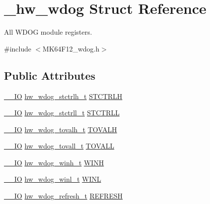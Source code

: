 \hypertarget{struct__hw__wdog}{}\section{\+\_\+hw\+\_\+wdog Struct Reference}
\label{struct__hw__wdog}


All W\+D\+OG module registers.  




{\ttfamily \#include $<$M\+K64\+F12\+\_\+wdog.\+h$>$}

\subsection*{Public Attributes}
\begin{DoxyCompactItemize}
\item 
\hyperlink{core__sc300_8h_aec43007d9998a0a0e01faede4133d6be}{\+\_\+\+\_\+\+IO} \hyperlink{union__hw__wdog__stctrlh}{hw\+\_\+wdog\+\_\+stctrlh\+\_\+t} \hyperlink{struct__hw__wdog_a36bedd5f334aad2a19f8006af30646d1}{S\+T\+C\+T\+R\+LH}
\item 
\hyperlink{core__sc300_8h_aec43007d9998a0a0e01faede4133d6be}{\+\_\+\+\_\+\+IO} \hyperlink{union__hw__wdog__stctrll}{hw\+\_\+wdog\+\_\+stctrll\+\_\+t} \hyperlink{struct__hw__wdog_aa2941a1c41e61c657a8ddb0c674c682d}{S\+T\+C\+T\+R\+LL}
\item 
\hyperlink{core__sc300_8h_aec43007d9998a0a0e01faede4133d6be}{\+\_\+\+\_\+\+IO} \hyperlink{union__hw__wdog__tovalh}{hw\+\_\+wdog\+\_\+tovalh\+\_\+t} \hyperlink{struct__hw__wdog_ad7f93dcad1df2a295661daad2f6b53c1}{T\+O\+V\+A\+LH}
\item 
\hyperlink{core__sc300_8h_aec43007d9998a0a0e01faede4133d6be}{\+\_\+\+\_\+\+IO} \hyperlink{union__hw__wdog__tovall}{hw\+\_\+wdog\+\_\+tovall\+\_\+t} \hyperlink{struct__hw__wdog_ae081dcd5823703c8c58c80f7dcd4781a}{T\+O\+V\+A\+LL}
\item 
\hyperlink{core__sc300_8h_aec43007d9998a0a0e01faede4133d6be}{\+\_\+\+\_\+\+IO} \hyperlink{union__hw__wdog__winh}{hw\+\_\+wdog\+\_\+winh\+\_\+t} \hyperlink{struct__hw__wdog_a2defae9e7cca4f46032b7bec7fa9f607}{W\+I\+NH}
\item 
\hyperlink{core__sc300_8h_aec43007d9998a0a0e01faede4133d6be}{\+\_\+\+\_\+\+IO} \hyperlink{union__hw__wdog__winl}{hw\+\_\+wdog\+\_\+winl\+\_\+t} \hyperlink{struct__hw__wdog_ac5090ab8729dae9d452a8606b550b86b}{W\+I\+NL}
\item 
\hyperlink{core__sc300_8h_aec43007d9998a0a0e01faede4133d6be}{\+\_\+\+\_\+\+IO} \hyperlink{union__hw__wdog__refresh}{hw\+\_\+wdog\+\_\+refresh\+\_\+t} \hyperlink{struct__hw__wdog_a62f26547c9ec2cc75875cbf783095c3c}{R\+E\+F\+R\+E\+SH}

\end{DoxyCompactItemize}
